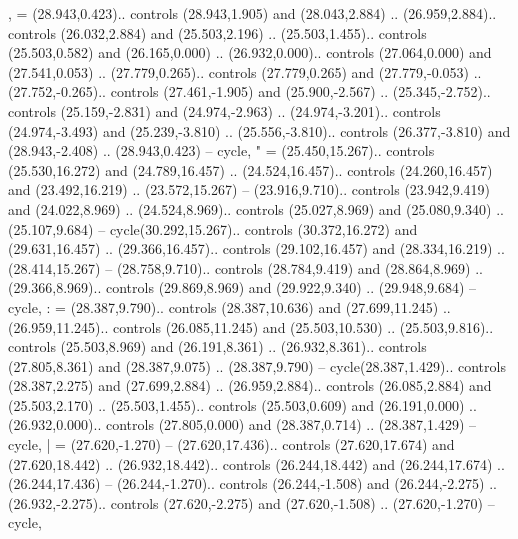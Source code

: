 {,} = {(28.943,0.423).. controls (28.943,1.905) and (28.043,2.884) .. (26.959,2.884).. controls (26.032,2.884) and (25.503,2.196) .. (25.503,1.455).. controls (25.503,0.582) and (26.165,0.000) .. (26.932,0.000).. controls (27.064,0.000) and (27.541,0.053) .. (27.779,0.265).. controls (27.779,0.265) and (27.779,-0.053) .. (27.752,-0.265).. controls (27.461,-1.905) and (25.900,-2.567) .. (25.345,-2.752).. controls (25.159,-2.831) and (24.974,-2.963) .. (24.974,-3.201).. controls (24.974,-3.493) and (25.239,-3.810) .. (25.556,-3.810).. controls (26.377,-3.810) and (28.943,-2.408) .. (28.943,0.423) -- cycle},
{"} = {(25.450,15.267).. controls (25.530,16.272) and (24.789,16.457) .. (24.524,16.457).. controls (24.260,16.457) and (23.492,16.219) .. (23.572,15.267) -- (23.916,9.710).. controls (23.942,9.419) and (24.022,8.969) .. (24.524,8.969).. controls (25.027,8.969) and (25.080,9.340) .. (25.107,9.684) -- cycle(30.292,15.267).. controls (30.372,16.272) and (29.631,16.457) .. (29.366,16.457).. controls (29.102,16.457) and (28.334,16.219) .. (28.414,15.267) -- (28.758,9.710).. controls (28.784,9.419) and (28.864,8.969) .. (29.366,8.969).. controls (29.869,8.969) and (29.922,9.340) .. (29.948,9.684) -- cycle},
{:} = {(28.387,9.790).. controls (28.387,10.636) and (27.699,11.245) .. (26.959,11.245).. controls (26.085,11.245) and (25.503,10.530) .. (25.503,9.816).. controls (25.503,8.969) and (26.191,8.361) .. (26.932,8.361).. controls (27.805,8.361) and (28.387,9.075) .. (28.387,9.790) -- cycle(28.387,1.429).. controls (28.387,2.275) and (27.699,2.884) .. (26.959,2.884).. controls (26.085,2.884) and (25.503,2.170) .. (25.503,1.455).. controls (25.503,0.609) and (26.191,0.000) .. (26.932,0.000).. controls (27.805,0.000) and (28.387,0.714) .. (28.387,1.429) -- cycle},
{|} = {(27.620,-1.270) -- (27.620,17.436).. controls (27.620,17.674) and (27.620,18.442) .. (26.932,18.442).. controls (26.244,18.442) and (26.244,17.674) .. (26.244,17.436) -- (26.244,-1.270).. controls (26.244,-1.508) and (26.244,-2.275) .. (26.932,-2.275).. controls (27.620,-2.275) and (27.620,-1.508) .. (27.620,-1.270) -- cycle},
